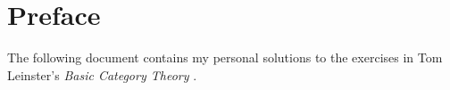 \chapter*{Preface}

The following document contains my personal solutions to the exercises in Tom Leinster’s \emph{Basic Category Theory} \cite{leinster_basic_category}.
